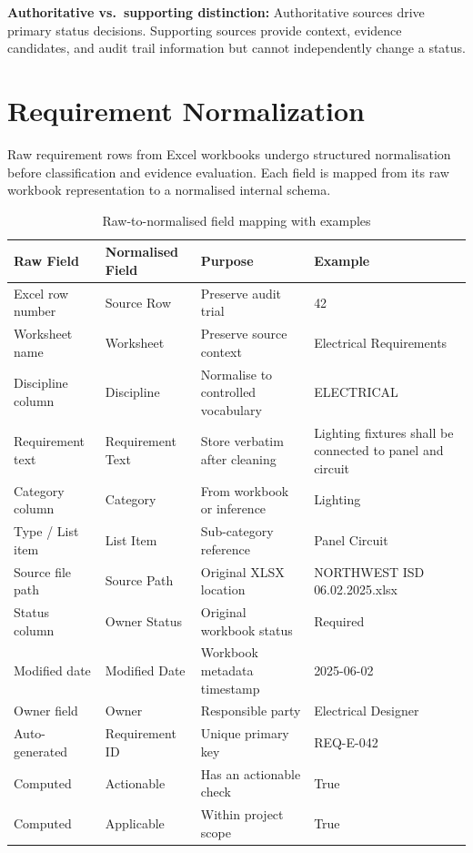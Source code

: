 \documentclass[10pt,letterpaper]{article}
\newcommand{\strong}[1]{\textbf{\textcolor{emaNavy}{#1}}}
\begin{document}
\strong{Authoritative vs.\ supporting distinction:} Authoritative sources drive primary status
decisions. Supporting sources provide context, evidence candidates, and audit trail information but
cannot independently change a status.

\section{Requirement Normalization}

Raw requirement rows from Excel workbooks undergo structured normalisation before classification and
evidence evaluation. Each field is mapped from its raw workbook representation to a normalised
internal schema.

\begin{longtable}{p{1.4in}p{1.5in}p{1.4in}p{1.5in}}
\caption{Raw-to-normalised field mapping with examples\label{tab:normalization}}\\
\toprule
\textbf{Raw Field} & \textbf{Normalised Field} & \textbf{Purpose} & \textbf{Example} \\
\midrule
\endhead
Excel row number & Source Row & Preserve audit trial & 42 \\
Worksheet name & Worksheet & Preserve source context & Electrical Requirements \\
Discipline column & Discipline & Normalise to controlled vocabulary & ELECTRICAL \\
Requirement text & Requirement Text & Store verbatim after cleaning & Lighting fixtures
  shall be connected to panel and circuit \\
Category column & Category & From workbook or inference & Lighting \\
Type / List item & List Item & Sub-category reference & Panel Circuit \\
Source file path & Source Path & Original XLSX location & NORTHWEST ISD 06.02.2025.xlsx \\
Status column & Owner Status & Original workbook status & Required \\
Modified date & Modified Date & Workbook metadata timestamp & 2025-06-02 \\
Owner field & Owner & Responsible party & Electrical Designer \\
Auto-generated & Requirement ID & Unique primary key & REQ-E-042 \\
Computed & Actionable & Has an actionable check & True \\
Computed & Applicable & Within project scope & True \\
\bottomrule
\end{longtable}
\end{document}
